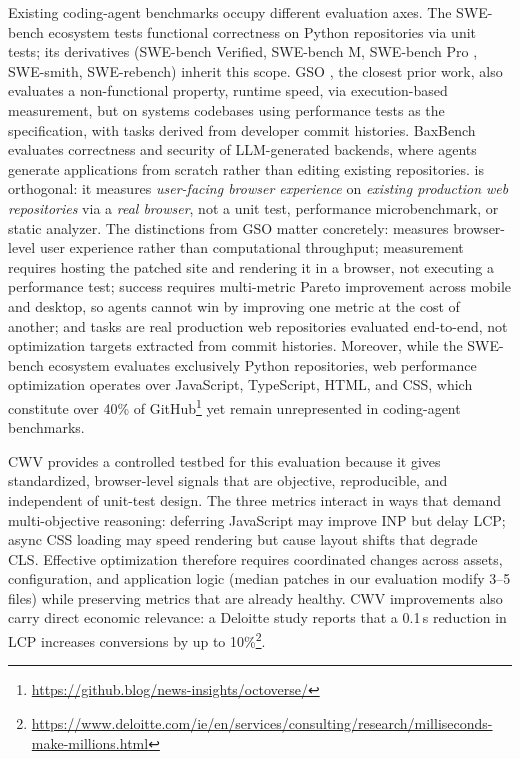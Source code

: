 Existing coding-agent benchmarks occupy different evaluation axes. The SWE-bench ecosystem \citep{jimenez2024swebenchlanguagemodelsresolve} tests functional correctness on Python repositories via unit tests; its derivatives (SWE-bench Verified, SWE-bench M, SWE-bench Pro \cite{deng2025swe}, SWE-smith, SWE-rebench) inherit this scope. GSO \cite{XXX_gso}, the closest prior work, also evaluates a non-functional property, runtime speed, via execution-based measurement, but on systems codebases using performance tests as the specification, with tasks derived from developer commit histories. BaxBench \cite{XXX_baxbench} evaluates correctness and security of LLM-generated backends, where agents generate applications from scratch rather than editing existing repositories. \OurBench is orthogonal: it measures \emph{user-facing browser experience} on \emph{existing production web repositories} via a \emph{real browser}, not a unit test, performance microbenchmark, or static analyzer. The distinctions from GSO matter concretely: \OurBench measures browser-level user experience rather than computational throughput; measurement requires hosting the patched site and rendering it in a browser, not executing a performance test; success requires multi-metric Pareto improvement across mobile and desktop, so agents cannot win by improving one metric at the cost of another; and tasks are real production web repositories evaluated end-to-end, not optimization targets extracted from commit histories. Moreover, while the SWE-bench ecosystem evaluates exclusively Python repositories, web performance optimization operates over JavaScript, TypeScript, HTML, and CSS, which constitute over 40\% of GitHub\footnote{\url{https://github.blog/news-insights/octoverse/}} yet remain unrepresented in coding-agent benchmarks.

CWV provides a controlled testbed for this evaluation because it gives standardized, browser-level signals that are objective, reproducible, and independent of unit-test design. The three metrics interact in ways that demand multi-objective reasoning: deferring JavaScript may improve INP but delay LCP; async CSS loading may speed rendering but cause layout shifts that degrade CLS. Effective optimization therefore requires coordinated changes across assets, configuration, and application logic (median patches in our evaluation modify 3--5 files) while preserving metrics that are already healthy. CWV improvements also carry direct economic relevance: a Deloitte study reports that a 0.1\,s reduction in LCP increases conversions by up to 10\%\footnote{\url{https://www.deloitte.com/ie/en/services/consulting/research/milliseconds-make-millions.html}}.

